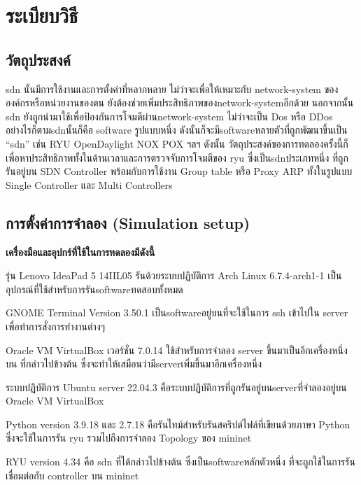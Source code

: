\section{ระเบียบวิธี} 

\subsection{วัตถุประสงค์}  
\gls{sdn} นั้นมีการใช้งานและการตั้งค่าที่หลากหลาย
ไม่ว่าจะเพื่อให้เหมาะกับ \gls{network-system} ขององค์กรหรือหน่วยงานของตน ยังต้องช่วยเพิ่มประสิทธิภาพของ\gls{network-system}อีกด้วย
นอกจากนั้น \gls{sdn} ยังถูกนำมาใช้เพื่อป้องกันการโจมตีผ่าน\gls{network-system} ไม่ว่าจะเป็น Dos หรือ DDos
อย่างไรก็ตาม\gls{sdn}นั้นก็คือ \gls{software} รูปแบบหนึ่ง
ดังนั้นก็จะมี\gls{software}หลายตัวที่ถูกพัฒนาขึ้นเป็น ``\gls{sdn}'' เช่น RYU OpenDaylight NOX POX ฯลฯ 
ดังนั้น
วัตถุประสงค์ของการทดลองครั้งนี้ก็เพื่อหาประสิทธิภาพทั้งในด้านเวลาและการตรวจจับการโจมตีของ \gls{ryu} ซึ่งเป็น\gls{sdn}ประเภทหนึ่ง ที่ถูกรันอยู่บน SDN Controller
พร้อมกับการใช้งาน Group table หรือ Proxy ARP ทั้งในรูปแบบ Single Controller และ Multi Controllers
\\
\subsection{การตั้งค่าการจำลอง (Simulation setup)}

\textbf{เครื่องมือและอุปกร์ที่ใช้ในการทดลองมีดังนี้} 

\notebook รุ่น Lenovo IdeaPad 5 14IIL05 รันด้วยระบบปฏิบัติการ Arch Linux 6.7.4-arch1-1 
เป็นอุปกรณ์ที่ใช้สำหรับการรัน\gls{software}ทดสอบทั้งหมด

GNOME Terminal Version 3.50.1 
เป็น\gls{software}อยู่บน\notebook ที่จะใช้ในการ ssh เข้าไปใน server เพื่อทำการสั่งการทำงานต่างๆ

Oracle VM VirtualBox เวอร์ชั่น 7.0.14 
ใช้สำหรับการจำลอง \gls{server} ขึ้นมาเป็นอีกเครื่องหนึ่งบน\notebook
ที่กล่าวไปข้างต้น ซึ่งจะทำให้เสมือนว่ามี\gls{server}เพิ่มขึ้นมาอีกเครื่องหนึ่ง

ระบบปฏิบัติการ Ubuntu server 22.04.3
คือระบบปฏิบัติการที่ถูกรันอยู่บน\gls{server}ที่จำลองอยู่บน Oracle VM VirtualBox 

Python version 3.9.18 และ 2.7.18 
คือรันไทม์สำหรับรันสคริปต์ไฟล์ที่เขียนด้วยภาษา Python ซึ่งจะใช้ในการรัน \gls{ryu} รวมไปถึงการจำลอง Topology ของ mininet

RYU version 4.34
คือ \gls{sdn} ที่ได้กล่าวไปข้างต้น ซึ่งเป็น\gls{software}หลักตัวหนึ่ง ที่จะถูกใช้ในการรันเชื่อมต่อกับ \gls{controller} บน mininet

